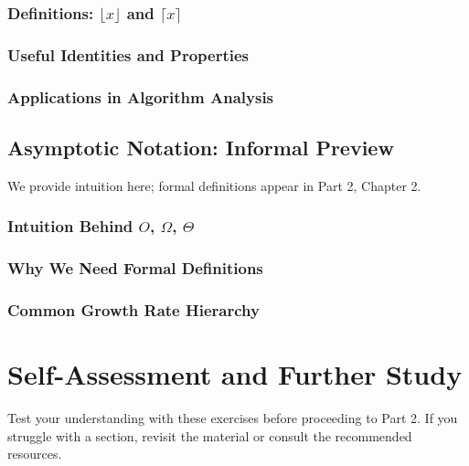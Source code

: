 \subsubsection{Definitions: $\lfloor x \rfloor$ and $\lceil x \rceil$}
\subsubsection{Useful Identities and Properties}
\subsubsection{Applications in Algorithm Analysis}
\subsection{Asymptotic Notation: Informal Preview}
\label{subsec:asymptotic-preview}

\begin{subsectionintro}
We provide intuition here; formal definitions appear in Part 2, Chapter 2.
\end{subsectionintro}

\subsubsection{Intuition Behind $O$, $\Omega$, $\Theta$}
\subsubsection{Why We Need Formal Definitions}
\subsubsection{Common Growth Rate Hierarchy}

\section{Self-Assessment and Further Study}
\label{sec:self-assessment}

\begin{sectionintro}
Test your understanding with these exercises before proceeding to Part 2.
If you struggle with a section, revisit the material or consult the recommended resources.
\end{sectionintro}

